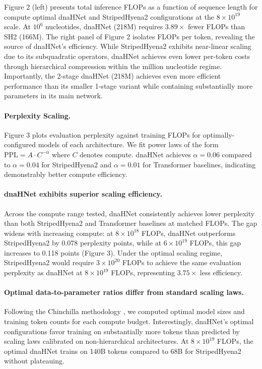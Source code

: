\documentclass{article}
\theoremstyle{plain}
\theoremstyle{definition}
\theoremstyle{remark}
\begin{document}
Figure 2 (left) presents total inference FLOPs as a function of sequence length for compute optimal dnaHNet and StripedHyena2 configurations at the $8 \times 10^{19}$ scale. At $10^6$ nucleotides, dnaHNet (218M) requires $3.89\times$ fewer FLOPs than SH2 (166M). The right panel of Figure 2 isolates FLOPs per token, revealing the source of dnaHNet's efficiency. While StripedHyena2 exhibits near-linear scaling due to its subquadratic operators, dnaHNet achieves even lower per-token costs through hierarchical compression within the million nucleotide regime. Importantly, the 2-stage dnaHNet (218M) achieves even more efficient performance than its smaller 1-stage variant while containing substantially more parameters in its main network.


\paragraph{Perplexity Scaling.}

Figure 3 plots evaluation perplexity against training FLOPs for optimally-configured models of each architecture. We fit power laws of the form $\text{PPL} = A \cdot C^{-\alpha}$ where $C$ denotes compute. dnaHNet achieves $\alpha = 0.06$ compared to $\alpha = 0.04$ for StripedHyena2 and $\alpha=0.01$ for Transformer baselines, indicating demonstrably better compute efficiency.

\paragraph{dnaHNet exhibits superior scaling efficiency.} Across the compute range tested, dnaHNet consistently achieves lower perplexity than both StripedHyena2 and Transformer baselines at matched FLOPs. The gap widens with increasing compute: at $8 \times 10^{18}$ FLOPs, dnaHNet outperforms StripedHyena2 by 0.078 perplexity points, while at $6 \times 10^{19}$ FLOPs, this gap increases to 0.118 points (Figure 3). Under the optimal scaling regime, StripedHyena2 would require $3 \times 10^{20}$ FLOPs to achieve the same evaluation perplexity as dnaHNet at $8 \times 10^{19}$ FLOPs, representing $3.75 \times$ less efficiency.


\paragraph{Optimal data-to-parameter ratios differ from standard scaling laws.} Following the Chinchilla methodology \cite{hoffmann2022trainingcomputeoptimallargelanguage}, we computed optimal model sizes and training token counts for each compute budget. Interestingly, dnaHNet's optimal configurations favor training on substantially more tokens than predicted by scaling laws calibrated on non-hierarchical architectures. At $8 \times 10^{19}$ FLOPs, the optimal dnaHNet trains on 140B tokens compared to 68B for StripedHyena2 without plateauing.
\end{document}
